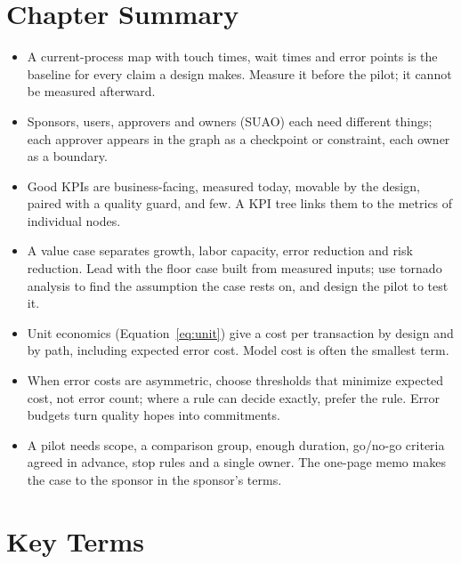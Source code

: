 \section*{Chapter Summary}

\begin{itemize}[itemsep=2pt]
  \item A current-process map with touch times, wait times and error points is the baseline for every claim a design makes. Measure it before the pilot; it cannot be measured afterward.
  \item Sponsors, users, approvers and owners (SUAO) each need different things; each approver appears in the graph as a checkpoint or constraint, each owner as a boundary.
  \item Good KPIs are business-facing, measured today, movable by the design, paired with a quality guard, and few. A KPI tree links them to the metrics of individual nodes.
  \item A value case separates growth, labor capacity, error reduction and risk reduction. Lead with the floor case built from measured inputs; use tornado analysis to find the assumption the case rests on, and design the pilot to test it.
  \item Unit economics (Equation~\ref{eq:unit}) give a cost per transaction by design and by path, including expected error cost. Model cost is often the smallest term.
  \item When error costs are asymmetric, choose thresholds that minimize expected cost, not error count; where a rule can decide exactly, prefer the rule. Error budgets turn quality hopes into commitments.
  \item A pilot needs scope, a comparison group, enough duration, go/no-go criteria agreed in advance, stop rules and a single owner. The one-page memo makes the case to the sponsor in the sponsor's terms.
\end{itemize}

\section*{Key Terms}

